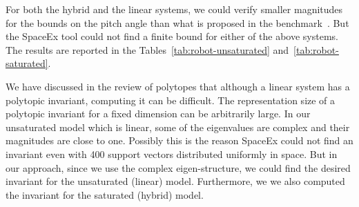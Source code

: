   For both the hybrid and the linear systems, we could
verify smaller magnitudes for the bounds on the pitch angle than what
is proposed in the benchmark~\cite{heinz2014benchmark}.  But the
SpaceEx tool could not find a finite bound for either of the above
systems.  The results are reported in the
Tables~\ref{tab:robot-unsaturated} and~\ref{tab:robot-saturated}.

  We have discussed in the review of polytopes that
although a linear system has a polytopic invariant, computing it can
be difficult.  The representation size of a polytopic invariant for a
fixed dimension can be arbitrarily large.  In our unsaturated model
which is linear, some of the eigenvalues are complex and their
magnitudes are close to one.  Possibly this is the reason SpaceEx
could not find an invariant even with 400 support vectors distributed 
uniformly in space.  But in our approach, since we use the complex
eigen-structure, we could find the desired invariant for the
unsaturated (linear) model.  Furthermore, we we also computed the
invariant for the saturated (hybrid) model.

